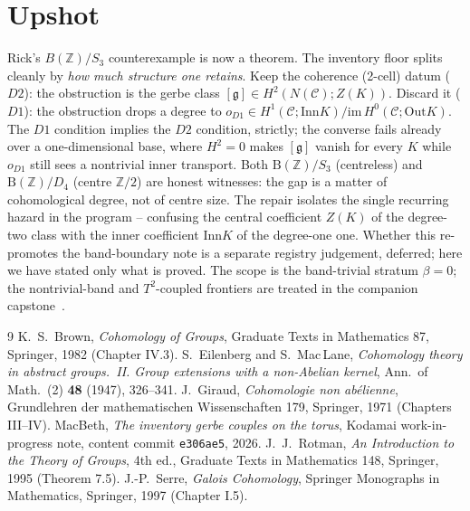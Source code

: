 \documentclass[11pt]{article}
\theoremstyle{definition}
\newcommand{\C}{\mathcal{C}}
\newcommand{\Z}{\mathbb{Z}}
\newcommand{\Inn}{\mathrm{Inn}}
\newcommand{\Out}{\mathrm{Out}}
\newcommand{\gerbe}{\mathfrak{g}}
\newcommand{\B}{\mathrm{B}}
\begin{document}
\section*{Upshot}

Rick's $B(\Z)/S_3$ counterexample is now a theorem. The inventory floor splits cleanly by
\emph{how much structure one retains}. Keep the coherence (2-cell) datum ($D2$): the
obstruction is the gerbe class $[\gerbe]\in H^2(N(\C);Z(K))$. Discard it ($D1$): the
obstruction drops a degree to $o_{D1}\in H^1(\C;\Inn K)/\mathrm{im}\,H^0(\C;\Out K)$. The
$D1$ condition implies the $D2$ condition, strictly; the converse fails already over a
one-dimensional base, where $H^2=0$ makes $[\gerbe]$ vanish for every $K$ while $o_{D1}$
still sees a nontrivial inner transport. Both $\B(\Z)/S_3$ (centreless) and $\B(\Z)/D_4$
(centre $\Z/2$) are honest witnesses: the gap is a matter of cohomological degree, not of
centre size. The repair isolates the single recurring
hazard in the program -- confusing the central coefficient $Z(K)$ of the degree-two class
with the inner coefficient $\Inn K$ of the degree-one one. Whether this re-promotes the
band-boundary note is a separate registry judgement, deferred; here we have stated only
what is proved. The scope is the band-trivial stratum $\beta=0$; the nontrivial-band and
$T^2$-coupled frontiers are treated in the companion capstone~\cite{macbeth-capstone}.

\begin{thebibliography}{9}
 K.~S.~Brown, \emph{Cohomology of Groups}, Graduate Texts in Mathematics 87,
Springer, 1982 (Chapter IV.3).
 S.~Eilenberg and S.~Mac\,Lane, \emph{Cohomology theory in abstract groups.~II.
Group extensions with a non-Abelian kernel}, Ann.\ of Math.\ (2) \textbf{48} (1947), 326--341.
 J.~Giraud, \emph{Cohomologie non abélienne}, Grundlehren der mathematischen
Wissenschaften 179, Springer, 1971 (Chapters III--IV).
 MacBeth, \emph{The inventory gerbe couples on the torus}, Kodamai
work-in-progress note, content commit \texttt{e306ae5}, 2026.
 J.~J.~Rotman, \emph{An Introduction to the Theory of Groups}, 4th ed.,
Graduate Texts in Mathematics 148, Springer, 1995 (Theorem 7.5).
 J.-P.~Serre, \emph{Galois Cohomology}, Springer Monographs in Mathematics,
Springer, 1997 (Chapter I.5).
\end{thebibliography}
\end{document}
